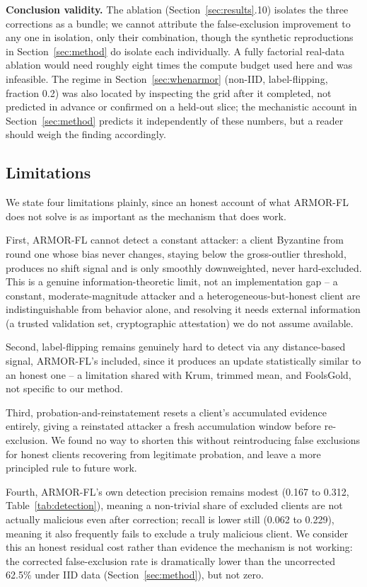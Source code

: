 \documentclass[pdflatex,iicol,sn-mathphys-num]{sn-jnl}%
\theoremstyle{thmstyleone}%
\theoremstyle{thmstyletwo}%
\theoremstyle{thmstylethree}%
\begin{document}
\textbf{Conclusion validity.} The ablation (Section~\ref{sec:results}.10) isolates the three corrections as a bundle; we cannot attribute the false-exclusion improvement to any one in isolation, only their combination, though the synthetic reproductions in Section~\ref{sec:method} do isolate each individually. A fully factorial real-data ablation would need roughly eight times the compute budget used here and was infeasible. The regime in Section~\ref{sec:whenarmor} (non-IID, label-flipping, fraction 0.2) was also located by inspecting the grid after it completed, not predicted in advance or confirmed on a held-out slice; the mechanistic account in Section~\ref{sec:method} predicts it independently of these numbers, but a reader should weigh the finding accordingly.

\subsection{Limitations}\label{sec:limitations}

We state four limitations plainly, since an honest account of what ARMOR-FL does not solve is as important as the mechanism that does work.

First, ARMOR-FL cannot detect a constant attacker: a client Byzantine from round one whose bias never changes, staying below the gross-outlier threshold, produces no shift signal and is only smoothly downweighted, never hard-excluded. This is a genuine information-theoretic limit, not an implementation gap -- a constant, moderate-magnitude attacker and a heterogeneous-but-honest client are indistinguishable from behavior alone, and resolving it needs external information (a trusted validation set, cryptographic attestation) we do not assume available.

Second, label-flipping remains genuinely hard to detect via any distance-based signal, ARMOR-FL's included, since it produces an update statistically similar to an honest one -- a limitation shared with Krum, trimmed mean, and FoolsGold, not specific to our method.

Third, probation-and-reinstatement resets a client's accumulated evidence entirely, giving a reinstated attacker a fresh accumulation window before re-exclusion. We found no way to shorten this without reintroducing false exclusions for honest clients recovering from legitimate probation, and leave a more principled rule to future work.

Fourth, ARMOR-FL's own detection precision remains modest (0.167 to 0.312, Table~\ref{tab:detection}), meaning a non-trivial share of excluded clients are not actually malicious even after correction; recall is lower still (0.062 to 0.229), meaning it also frequently fails to exclude a truly malicious client. We consider this an honest residual cost rather than evidence the mechanism is not working: the corrected false-exclusion rate is dramatically lower than the uncorrected 62.5\% under IID data (Section~\ref{sec:method}), but not zero.
\end{document}
